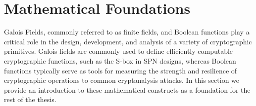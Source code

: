 \section{Mathematical Foundations}

Galois Fields, commonly referred to as finite fields, and Boolean functions play a critical role in the design, development, and analysis of a variety of cryptographic primitives. Galois fields are commonly used to define efficiently computable cryptographic functions, such as the S-box in SPN designs, whereas Boolean functions typically serve as tools for measuring the strength and resilience of cryptographic operations to common cryptanalysis attacks. In this section we provide an introduction to these mathematical constructs as a foundation for the rest of the thesis. 





